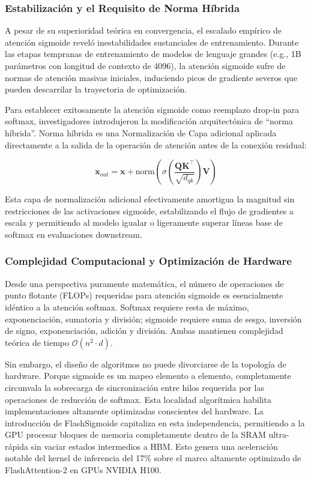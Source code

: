 \documentclass[11pt,a4paper]{article}
\begin{document}
\subsubsection{Estabilización y el Requisito de Norma Híbrida}

A pesar de su superioridad teórica en convergencia, el escalado empírico de atención sigmoide reveló inestabilidades sustanciales de entrenamiento. Durante las etapas tempranas de entrenamiento de modelos de lenguaje grandes (e.g., 1B parámetros con longitud de contexto de 4096), la atención sigmoide sufre de normas de atención masivas iniciales, induciendo picos de gradiente severos que pueden descarrilar la trayectoria de optimización.

Para establecer exitosamente la atención sigmoide como reemplazo drop-in para softmax, investigadores introdujeron la modificación arquitectónica de ``norma híbrida''. Norma híbrida es una Normalización de Capa adicional aplicada directamente a la salida de la operación de atención antes de la conexión residual:

$$
\mathbf{x}_{out} = \mathbf{x} + \text{norm}\left(\sigma\left(\frac{\mathbf{Q}\mathbf{K}^\top}{\sqrt{d_{qk}}}\right)\mathbf{V}\right)
$$

Esta capa de normalización adicional efectivamente amortigua la magnitud sin restricciones de las activaciones sigmoide, estabilizando el flujo de gradientes a escala y permitiendo al modelo igualar o ligeramente superar líneas base de softmax en evaluaciones downstream.

\subsubsection{Complejidad Computacional y Optimización de Hardware}

Desde una perspectiva puramente matemática, el número de operaciones de punto flotante (FLOPs) requeridas para atención sigmoide es esencialmente idéntico a la atención softmax. Softmax requiere resta de máximo, exponenciación, sumatoria y división; sigmoide requiere suma de sesgo, inversión de signo, exponenciación, adición y división. Ambas mantienen complejidad teórica de tiempo $\mathcal{O}(n^2 \cdot d)$.

Sin embargo, el diseño de algoritmos no puede divorciarse de la topología de hardware. Porque sigmoide es un mapeo elemento a elemento, completamente circunvala la sobrecarga de sincronización entre hilos requerida por las operaciones de reducción de softmax. Esta localidad algorítmica habilita implementaciones altamente optimizadas conscientes del hardware. La introducción de FlashSigmoide capitaliza en esta independencia, permitiendo a la GPU procesar bloques de memoria completamente dentro de la SRAM ultra-rápida sin vaciar estados intermedios a HBM. Esto genera una aceleración notable del kernel de inferencia del 17\% sobre el marco altamente optimizado de FlashAttention-2 en GPUs NVIDIA H100.
\end{document}
